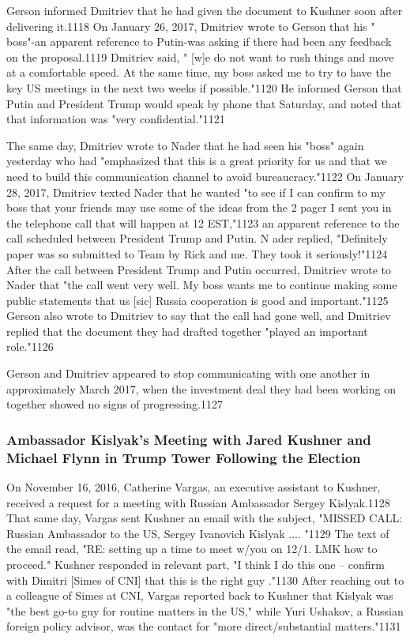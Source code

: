 Gerson informed Dmitriev that he had given the document to Kushner soon after delivering it.1118 On January 26, 2017, Dmitriev wrote to Gerson that his " boss"-an apparent reference to Putin-was asking if  there had been any feedback on the proposal.1119 Dmitriev said, " [w]e do not want to rush things and move at a comfortable speed. At the same time, my boss asked me to try to have the key US meetings in the next two weeks if possible."1120 He informed Gerson that Putin and President Trump would speak by phone that Saturday, and noted that that information was "very confidential."1121

The same day, Dmitriev wrote to Nader that he had seen his "boss"  again yesterday who had "emphasized that this is a  great priority for us and that we need to build this communication channel to avoid bureaucracy."1122 On January 28, 2017, Dmitriev texted Nader that he wanted "to see if I can confirm to my boss that your friends may use some of the ideas from the 2 pager I sent you in the telephone call that will happen at 12 EST,"1123 an apparent reference to the call scheduled between President Trump and Putin. N ader replied, "Definitely paper was so submitted to Team by Rick and me. They took it seriously!"1124 After the call between President Trump and Putin occurred, Dmitriev wrote to Nader that "the call went very well. My boss wants me to continue making some public statements that us [sic] Russia cooperation is good and important."1125 Gerson also wrote to Dmitriev to say that the call had gone well, and Dmitriev replied that the document they had drafted together "played an important role."1126

Gerson and Dmitriev appeared to stop communicating with one another in approximately March 2017, when the investment deal they had been working on together showed no signs of progressing.1127

\subsubsection{Ambassador Kislyak's Meeting with Jared Kushner and Michael Flynn in Trump Tower Following the Election}

On November 16, 2016, Catherine Vargas, an executive assistant to Kushner, received a request for a meeting with Russian Ambassador Sergey Kislyak.1128 That same day, Vargas sent Kushner an email with the subject, "MISSED CALL: Russian Ambassador to the US, Sergey Ivanovich Kislyak .... "1129 The text of the email read, "RE: setting up a time to meet w/you on 12/1. LMK how to proceed." Kushner responded in relevant part, "I think I do this one -- confirm with Dimitri [Simes  of CNI] that this is the right guy ."1130 After reaching out to a colleague of Simes at CNI, Vargas reported back to Kushner that Kislyak was "the best go-to guy for routine matters in the US," while Yuri Ushakov, a  Russian foreign policy advisor, was the contact for "more direct/substantial matters."1131


